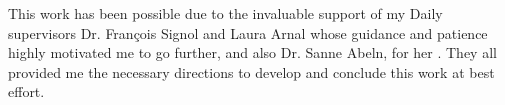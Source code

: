 This work has been possible due to the invaluable support of my Daily supervisors Dr. François Signol and Laura Arnal whose guidance and patience highly motivated me to go further, and also Dr. Sanne Abeln, for her . They all provided me the necessary directions to develop and conclude this work at best effort.

